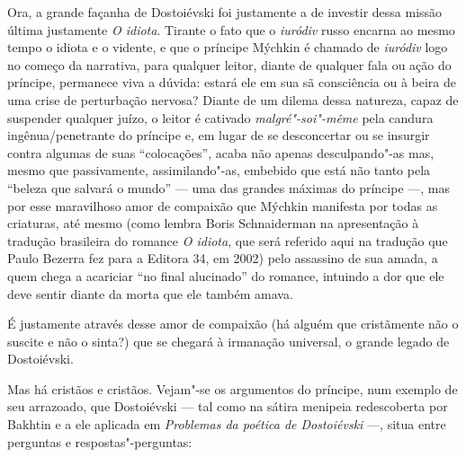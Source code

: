 Ora, a grande façanha de Dostoiévski foi justamente a de investir dessa
missão última justamente \emph{O idiota}. Tirante o fato que
o \emph{iuródiv} russo encarna ao mesmo tempo o idiota e o vidente, e
que o príncipe Mýchkin é chamado de \emph{iuródiv} logo no começo da
narrativa, para qualquer leitor, diante de qualquer fala ou ação do
príncipe, permanece viva a dúvida: estará ele em sua sã consciência ou à
beira de uma crise de perturbação nervosa? Diante de um dilema dessa
natureza, capaz de suspender qualquer juízo, o leitor é
cativado \emph{malgré"-soi"-même} pela candura ingênua/penetrante do
príncipe e, em lugar de se desconcertar ou se insurgir contra algumas
de suas ``colocações'', acaba não apenas desculpando"-as mas, mesmo que
passivamente, assimilando"-as, embebido que está não tanto pela ``beleza que salvará o mundo'' --- uma das grandes máximas do príncipe
---, mas por esse maravilhoso amor de compaixão que Mýchkin manifesta
por todas as criaturas, até mesmo (como lembra Boris Schnaiderman na
apresentação à tradução brasileira do romance \emph{O idiota}, que
será referido aqui na tradução que Paulo Bezerra
fez para a Editora 34, em 2002) pelo assassino de sua amada, a
quem chega a acariciar ``no final alucinado'' do romance, intuindo a
dor que ele deve sentir diante da morta que ele também amava.

É justamente através desse amor de compaixão (há alguém que cristãmente
não o suscite e não o sinta?) que se chegará à irmanação universal, o
grande legado de Dostoiévski.

Mas há cristãos e cristãos. Vejam"-se os argumentos do príncipe,
num exemplo de seu arrazoado, que Dostoiévski --- tal como na sátira
menipeia redescoberta por Bakhtin e a ele aplicada em \emph{Problemas da
poética de Dostoiévski} ---, situa entre
perguntas e respostas"-perguntas:

